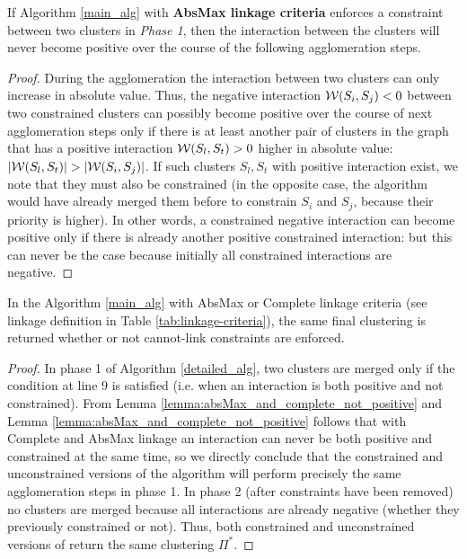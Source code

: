 \begin{lemma} \label{lemma:absMax_and_complete_not_positive}
If \algname{} Algorithm \ref{main_alg} with \textbf{AbsMax linkage criteria} enforces a constraint between two clusters in \emph{Phase 1}, then the interaction between the clusters will never become positive over the course of the following agglomeration steps.
\end{lemma}
\begin{proof}
During the agglomeration the interaction between two clusters can only increase in absolute value. Thus, the negative interaction $\mathcal{W}{}(S_i,S_j)<0$ between two constrained clusters can possibly become positive over the course of next agglomeration steps only if there is at least another pair of clusters in the graph that has a positive interaction $\mathcal{W}{}(S_l,S_t)>0$ higher in absolute value: $|\mathcal{W}{}(S_l,S_t)| > |\mathcal{W}{}(S_i,S_j)|$.
If such clusters $S_l, S_t$ with positive interaction exist, we note that they must also be constrained (in the opposite case, the algorithm would have already merged them before to constrain $S_i$ and $S_j$, because their priority is higher). In other words, a constrained negative interaction can become positive only if there is already another positive constrained interaction: but this can never be the case because initially all constrained interactions are negative.
\end{proof}

\begin{lemma} \label{lemma:absMax_and_complete_property}
In the \algname{} Algorithm \ref{main_alg} with AbsMax or Complete linkage criteria (see linkage definition in Table \ref{tab:linkage-criteria}), the same final clustering is returned whether or not cannot-link constraints are enforced.
\end{lemma}
\begin{proof}
In phase 1 of Algorithm \ref{detailed_alg}, two clusters are merged only if the condition at line 9 is satisfied (i.e. when an interaction is both positive and not constrained). From Lemma \ref{lemma:absMax_and_complete_not_positive} and Lemma \ref{lemma:absMax_and_complete_not_positive} follows that with Complete and AbsMax linkage an interaction can never be both positive and constrained at the same time, so we directly conclude that the constrained and unconstrained versions of the algorithm will perform precisely the same agglomeration steps in phase 1.
In phase 2 (after constraints have been removed) no clusters are merged because all interactions are already negative (whether they previously constrained or not). Thus, both constrained and unconstrained versions of \algname{} return the same clustering $\Pi^*$.
\end{proof}

